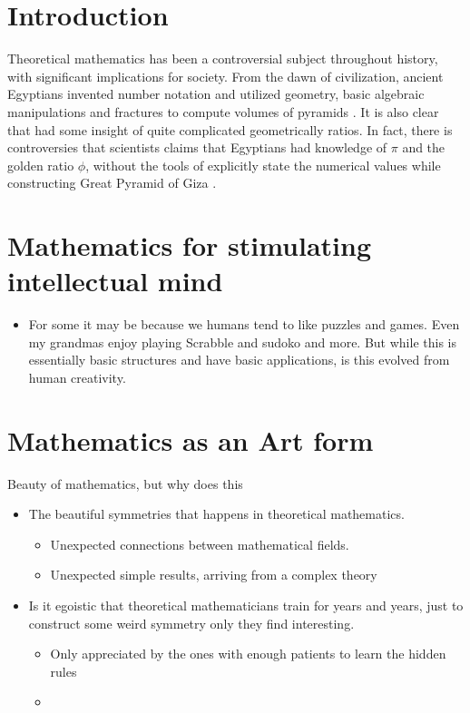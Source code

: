 \documentclass[10pt,conference]{IEEEtran}
\begin{document}
\begin{sloppy}
\section{Introduction}\label{sec:introduction}

Theoretical mathematics has been a controversial subject throughout history, with significant implications for society. From the dawn of civilization, ancient Egyptians invented number notation and utilized geometry, basic algebraic manipulations and fractures to compute volumes
of pyramids \cite{imhausen2016mathematics}. It is also clear that had some insight of quite complicated geometrically ratios. In fact, there is controversies that scientists claims that Egyptians had knowledge of $\pi $ and the golden ratio $\phi $,
without the tools of explicitly state the numerical values while constructing Great Pyramid of Giza \cite{robins1985mathematical}.



\newpage
\section{Mathematics for stimulating intellectual mind}%
\label{sec:mathematics_for_stimulating_intellectual_mind}

\begin{itemize}
    \item For some it may be because we humans tend to like puzzles and games. Even my grandmas enjoy playing Scrabble and sudoko and more. But while this is essentially basic structures and have basic applications, is this evolved from human creativity.
\end{itemize}


\newpage
\section{Mathematics as an Art form}%
\label{sec:mathematics_for_stimulating_intellectual_mind}

Beauty of mathematics, but why does this
\begin{itemize}
    \item The beautiful symmetries that happens in theoretical mathematics.
        \begin{itemize}
            \item Unexpected connections between mathematical fields.
            \item Unexpected simple results, arriving from a complex theory
        \end{itemize}
    \item Is it egoistic that theoretical mathematicians train for years and years, just to construct some weird symmetry only they find interesting.
        \begin{itemize}
            \item Only appreciated by the ones with enough patients to learn the hidden rules
            \item
        \end{itemize}
\end{itemize}


\end{sloppy}
\end{document}

